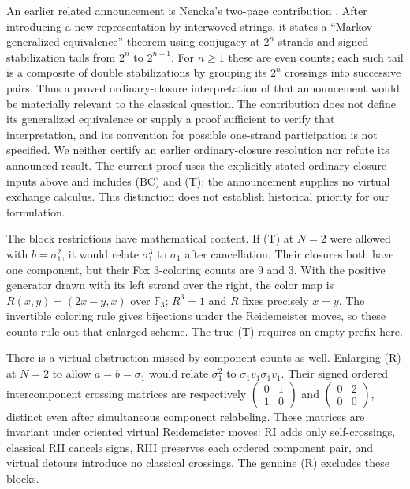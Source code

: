 \documentclass[11pt]{article}
\newcommand{\sig}{\sigma}
\begin{document}
An earlier related announcement is Nencka's two-page contribution
\cite{Nencka}. After introducing a new representation by interwoved strings,
it states a ``Markov generalized equivalence'' theorem using conjugacy at
$2^n$ strands and signed stabilization tails from $2^n$ to $2^{n+1}$.
For $n\ge1$ these are even counts; each such tail is a composite of double
stabilizations by grouping its $2^n$ crossings into successive pairs.
Thus a proved ordinary-closure interpretation of that announcement would be
materially relevant to the classical question. The contribution does not
define its generalized equivalence or supply a proof sufficient to verify
that interpretation, and its convention for possible one-strand participation
is not specified. We neither certify an earlier ordinary-closure resolution
nor refute its announced result. The current proof uses the explicitly stated
ordinary-closure inputs above and includes (BC) and (T); the announcement
supplies no virtual exchange calculus. This distinction does not establish
historical priority for our formulation.

The block restrictions have mathematical content. If (T) at $N=2$ were allowed
with $b=\sig_1^2$, it would relate $\sig_1^3$ to $\sig_1$ after cancellation.
Their closures both have one component, but their Fox $3$-coloring counts are
$9$ and $3$. With the positive generator drawn with its left strand over the right,
the color map is $R(x,y)=(2x-y,x)$ over $\mathbb F_3$; $R^3=1$ and $R$ fixes precisely $x=y$.
The invertible coloring rule gives bijections under the Reidemeister moves,
so these counts rule out that enlarged scheme. The true (T) requires an empty
prefix here.

There is a virtual obstruction missed by component counts as well. Enlarging
(R) at $N=2$ to allow $a=b=\sig_1$ would relate $\sig_1^2$ to
$\sig_1v_1\sig_1v_1$. Their signed ordered intercomponent crossing matrices are
respectively $\left(\begin{smallmatrix}0&1\\1&0\end{smallmatrix}\right)$ and
$\left(\begin{smallmatrix}0&2\\0&0\end{smallmatrix}\right)$, distinct even after
simultaneous component relabeling. These matrices are invariant under oriented
virtual Reidemeister moves: RI adds only self-crossings, classical RII cancels
signs, RIII preserves each ordered component pair, and virtual detours introduce
no classical crossings.
The genuine (R) excludes these blocks.
\end{document}
